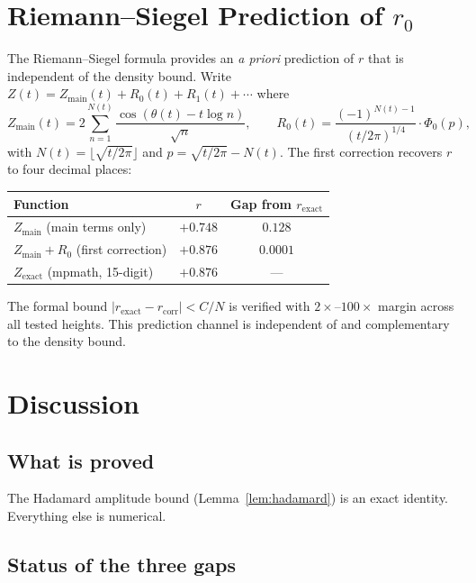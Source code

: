 \documentclass[11pt,a4paper]{article}
\begin{document}
\section{Riemann--Siegel Prediction of $r_0$}

The Riemann--Siegel formula provides an \emph{a priori} prediction of $r$ that is independent of the density bound.
Write $Z(t) = Z_{\mathrm{main}}(t) + R_0(t) + R_1(t) + \cdots$ where
\[
Z_{\mathrm{main}}(t) = 2\sum_{n=1}^{N(t)} \frac{\cos(\theta(t) - t\log n)}{\sqrt{n}}, \qquad
R_0(t) = \frac{(-1)^{N(t)-1}}{(t/2\pi)^{1/4}} \cdot \Phi_0(p),
\]
with $N(t) = \lfloor\sqrt{t/2\pi}\rfloor$ and $p = \sqrt{t/2\pi} - N(t)$.
The first correction recovers $r$ to four decimal places:

\begin{center}
\begin{tabular}{lcc}
\toprule
Function & $r$ & Gap from $r_{\mathrm{exact}}$ \\
\midrule
$Z_{\mathrm{main}}$ (main terms only) & $+0.748$ & $0.128$ \\
$Z_{\mathrm{main}} + R_0$ (first correction) & $+0.876$ & $\mathbf{0.0001}$ \\
$Z_{\mathrm{exact}}$ (mpmath, 15-digit) & $+0.876$ & --- \\
\bottomrule
\end{tabular}
\end{center}

The formal bound $|r_{\mathrm{exact}} - r_{\mathrm{corr}}| < C/N$ is verified with $2\times$--$100\times$ margin across all tested heights.
This prediction channel is independent of and complementary to the density bound.


\section{Discussion}

\subsection{What is proved}
The Hadamard amplitude bound (Lemma~\ref{lem:hadamard}) is an exact identity.
Everything else is numerical.

\subsection{Status of the three gaps}
\end{document}
